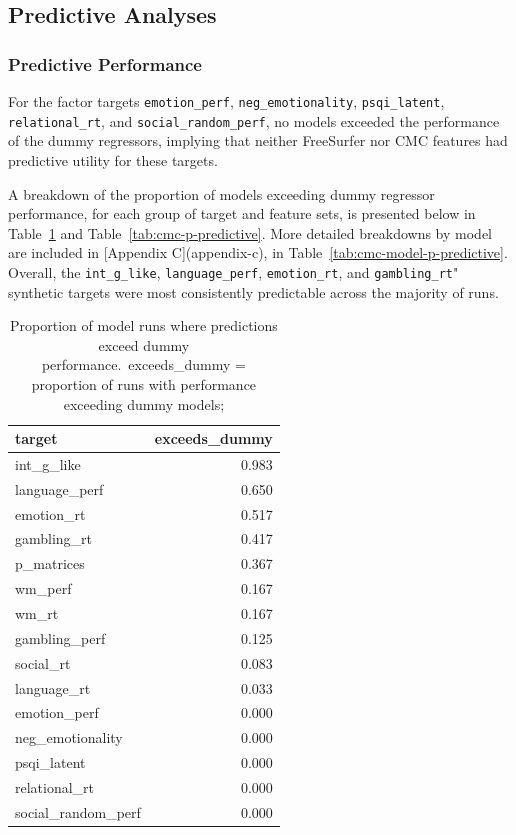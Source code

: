 \documentclass{article}
\begin{document}
%


\subsection{Predictive Analyses}

\subsubsection{Predictive Performance}

For the factor targets \texttt{emotion\_perf}, \texttt{neg\_emotionality},
\texttt{psqi\_latent}, \texttt{relational\_rt}, and
\texttt{social\_random\_perf}, no models exceeded the performance of the
dummy regressors, implying that neither FreeSurfer nor CMC features had
predictive utility for these targets.

A breakdown of the proportion of models exceeding dummy regressor
performance, for each group of target and feature sets, is presented below in
Table~\ref{tab:cmc-p-target-predictive} and Table~\ref{tab:cmc-p-predictive}.
More detailed breakdowns by model are included in [Appendix C](appendix-c),
in Table~\ref{tab:cmc-model-p-predictive}. Overall, the
\texttt{int\_g\_like}, \texttt{language\_perf}, \texttt{emotion\_rt}, and
\texttt{gambling\_rt}" synthetic targets were most consistently predictable
across the majority of runs.


\begin{table}
\centering
\begin{tabular}{lr}
	\toprule
	target & exceeds\_dummy \\
	\midrule
	int\_g\_like & 0.983 \\
	language\_perf & 0.650 \\
	emotion\_rt & 0.517 \\
	gambling\_rt & 0.417 \\
	p\_matrices & 0.367 \\
	wm\_perf & 0.167 \\
	wm\_rt & 0.167 \\
	gambling\_perf & 0.125 \\
	social\_rt & 0.083 \\
	language\_rt & 0.033 \\
	emotion\_perf & 0.000 \\
	neg\_emotionality & 0.000 \\
	psqi\_latent & 0.000 \\
	relational\_rt & 0.000 \\
	social\_random\_perf & 0.000 \\
	\bottomrule
\end{tabular}
\footnotesize
\caption{Proportion of model runs where predictions exceed dummy performance.\
exceeds\_dummy = proportion of runs with performance exceeding dummy models;}
\normalsize
\label{tab:cmc-p-target-predictive}
\end{table}
\end{document}
